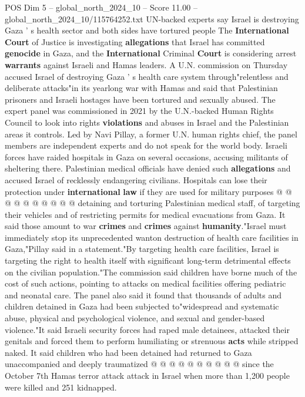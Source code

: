 \begin{textsample}{POS Dim 5 – global\_north\_2024\_10 – Score 11.00 – global\_north\_2024\_10/115764252.txt}  \label{ex:f5_pos_408}
UN-backed experts say Israel is destroying Gaza ' s health sector and both sides have tortured people The \textbf{International} \textbf{Court} of Justice is investigating \textbf{allegations} that Israel has committed \textbf{genocide} in Gaza, and the \textbf{International} Criminal \textbf{Court} is considering arrest \textbf{warrants} against Israeli and Hamas leaders.
A U.N. commission on Thursday accused Israel of destroying Gaza ' s health care system through"relentless and deliberate attacks"in its yearlong war with Hamas and said that Palestinian prisoners and Israeli hostages have been tortured and sexually abused.
The expert panel was commissioned in 2021 by the U.N.-backed Human Rights Council to look into rights \textbf{violations} and abuses in Israel and the Palestinian areas it controls.
Led by Navi Pillay, a former U.N. human rights chief, the panel members are independent experts and do not speak for the world body.
Israeli forces have raided hospitals in Gaza on several occasions, accusing militants of sheltering there.
Palestinian medical officials have denied such \textbf{allegations} and accused Israel of recklessly endangering civilians.
Hospitals can lose their protection under \textbf{international} \textbf{law} if they are used for military purposes @ @ @ @ @ @ @ @ @ @ detaining and torturing Palestinian medical staff, of targeting their vehicles and of restricting permits for medical evacuations from Gaza.
It said those amount to war \textbf{crimes} and \textbf{crimes} against \textbf{humanity}."Israel must immediately stop its unprecedented wanton destruction of health care facilities in Gaza,"Pillay said in a statement."By targeting health care facilities, Israel is targeting the right to health itself with significant long-term detrimental effects on the civilian population."The commission said children have borne much of the cost of such actions, pointing to attacks on medical facilities offering pediatric and neonatal care.
The panel also said it found that thousands of adults and children detained in Gaza had been subjected to"widespread and systematic abuse, physical and psychological violence, and sexual and gender-based violence."It said Israeli security forces had raped male detainees, attacked their genitals and forced them to perform humiliating or strenuous \textbf{acts} while stripped naked.
It said children who had been detained had returned to Gaza unaccompanied and deeply traumatized @ @ @ @ @ @ @ @ @ @ since the October 7th Hamas terror attack attack in Israel when more than 1,200 people were killed and 251 kidnapped.

\end{textsample}
